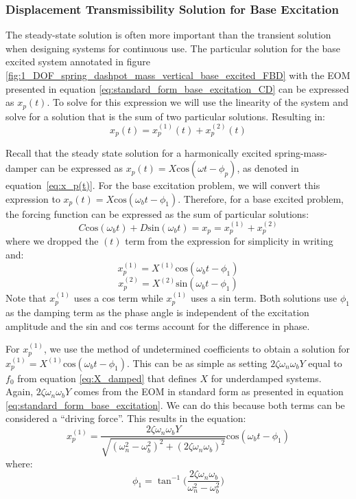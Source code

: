 \documentclass[12pt,letter]{article}
\begin{document}
	\subsubsection{Displacement Transmissibility Solution for Base Excitation}
		The steady-state solution is often more important than the transient solution when designing systems for continuous use. The particular solution for the base excited system annotated in figure \ref{fig:1_DOF_spring_dashpot_mass_vertical_base_excited_FBD} with the EOM presented in equation \ref{eq:standard_form_base_excitation_CD} can be expressed as $	x_p(t)$. To solve for this expression we will use the linearity of the system and solve for a solution that is the sum of two particular solutions. Resulting in:
		\begin{equation}
 x_p(t) = 	x_p^{(1)}(t) + 	x_p^{(2)}(t)  
		\end{equation}
		
 Recall that the steady state solution for a harmonically excited spring-mass-damper can be expressed as $x_p(t) = X\text{cos}(\omega t - \phi_p)$, as denoted in equation~\ref{eq:x_p(t)}. For the base excitation problem, we will convert this expression to $x_p(t) = X\text{cos}(\omega_b t - \phi_1)$. Therefore, for a base excited problem, the forcing function can be expressed as the sum of particular solutions:
		\begin{equation}
			C \text{cos}(\omega_b t)  + D \text{sin}(\omega_b t)   = x_p = 	x_p^{(1)} + 	x_p^{(2)} 
		\end{equation}
		where we dropped the $(t)$ term from the expression for simplicity in writing and:
		\begin{equation}
			x_p^{(1)} = X^{(1)}\text{cos}(\omega_b t - \phi_1)
		\end{equation}
		\begin{equation}
			x_p^{(2)} = X^{(2)} \text{sin}(\omega_b t - \phi_1)
		\end{equation}
		Note that $x_p^{(1)}$ uses a cos term while $x_p^{(1)}$ uses a sin term. Both solutions use $\phi_1$ as the damping term as the phase angle is independent of the excitation amplitude and the sin and cos terms account for the difference in phase. 
		
		For $x_p^{(1)}$, we use the method of undetermined coefficients to obtain a solution for $x_p^{(1)} = X^{(1)}\text{cos}(\omega_b t - \phi_1)$. This can be as simple as setting $2 \zeta \omega_n \omega_b Y$ equal to $f_0$ from equation \ref{eq:X_damped} that defines $X$ for underdamped systems. Again, $2 \zeta \omega_n \omega_b Y$  comes from the EOM in standard form as presented in equation 	
		\ref{eq:standard_form_base_excitation}. We can do this because both terms can be considered a ``driving force''. This results in the equation:
		\begin{equation}
			x_p^{(1)} = \frac{2 \zeta \omega_n \omega_b Y}{\sqrt{(\omega_n^2 - \omega_b^2)^2 +  (2\zeta \omega_n \omega_b)^2}}  \text{cos}(\omega_b t - \phi_1)
			\label{eq:xp_1}
		\end{equation}
		where:
		\begin{equation}
			\phi_1 = \tan^{-1} \bigg(\frac{2\zeta \omega_n \omega_b}{\omega_n^2 - \omega_b^2}\bigg)
		\end{equation}
		
\end{document}
